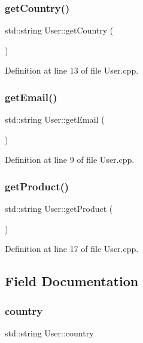 \subsubsection{\texorpdfstring{get\+Country()}{getCountry()}}
{\footnotesize\ttfamily std\+::string User\+::get\+Country (\begin{DoxyParamCaption}{ }\end{DoxyParamCaption})}



Definition at line 13 of file User.\+cpp.

\mbox{\label{class_user_a7e15815ed9167b628dec1d751c9708df}} 
\subsubsection{\texorpdfstring{get\+Email()}{getEmail()}}
{\footnotesize\ttfamily std\+::string User\+::get\+Email (\begin{DoxyParamCaption}{ }\end{DoxyParamCaption})}



Definition at line 9 of file User.\+cpp.

\mbox{\label{class_user_a0df460dd033b08558b219df27168b87f}} 
\subsubsection{\texorpdfstring{get\+Product()}{getProduct()}}
{\footnotesize\ttfamily std\+::string User\+::get\+Product (\begin{DoxyParamCaption}{ }\end{DoxyParamCaption})}



Definition at line 17 of file User.\+cpp.



\subsection{Field Documentation}
\mbox{\label{class_user_ad381c7059c4b6104805f78e9a16e3316}} 
\subsubsection{\texorpdfstring{country}{country}}
{\footnotesize\ttfamily std\+::string User\+::country\hspace{0.3cm}{\ttfamily [private]}}



